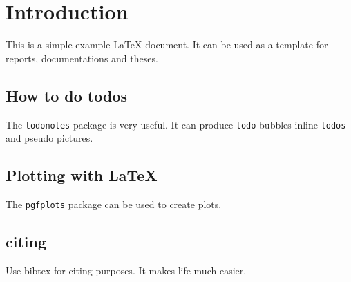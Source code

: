 \chapter{Introduction}\label{introduction}
This is a simple example \LaTeX{} document.
It can be used as a template for reports, documentations and theses.

\section{How to do todos}
The \verb+todonotes+ package is very useful.
It can produce \verb+todo+ bubbles  inline \verb+todos+  and pseudo pictures.

\section{Plotting with \LaTeX{}}
The \verb+pgfplots+ package can be used to create plots.
\begin{figure}

\end{figure}

\section{citing}
Use bibtex for citing \cite{Hairer1996} purposes. 
It makes life much easier\cite{Kenwright2012}.
